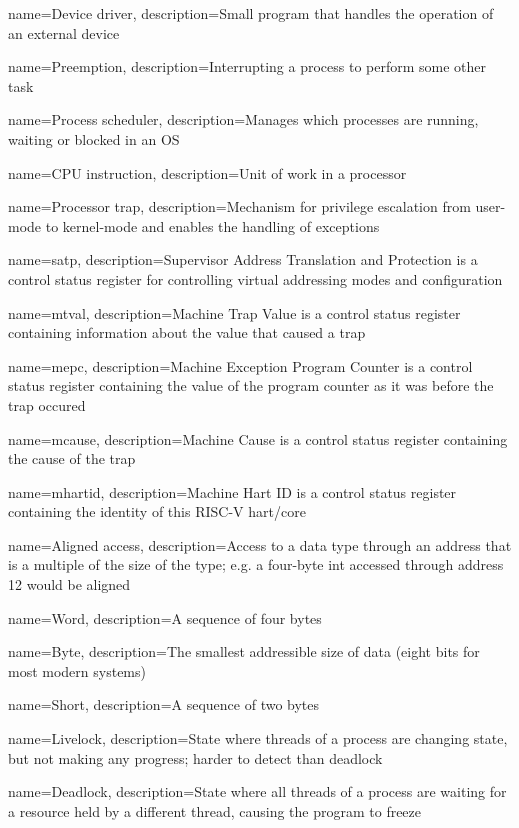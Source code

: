  {
    name=Device driver,
    description={Small program that handles the operation of an external device}
}

 {
    name=Preemption,
    description={Interrupting a process to perform some other task}
}

 {
    name=Process scheduler,
    description={Manages which processes are running, waiting or blocked in an OS}
}

 {
    name=CPU instruction,
    description={Unit of work in a processor}
}

 {
    name=Processor trap,
    description={Mechanism for privilege escalation from user-mode to kernel-mode and enables the handling of exceptions}
}

 {
    name=satp,
    description={Supervisor Address Translation and Protection is a control status register for controlling virtual addressing modes and configuration}
}

 {
    name=mtval,
    description={Machine Trap Value is a control status register containing information about the value that caused a trap}
}

 {
    name=mepc,
    description={Machine Exception Program Counter is a control status register containing the value of the program counter as it was before the trap occured}
}

 {
    name=mcause,
    description={Machine Cause is a control status register containing the cause of the trap}
}

 {
    name=mhartid,
    description={Machine Hart ID is a control status register containing the identity of this RISC-V hart/core}
}

 {
    name=Aligned access,
    description={Access to a data type through an address that is a multiple of the size of the type; e.g. a four-byte int accessed through address 12 would be aligned}
}

 {
    name=Word,
    description={A sequence of four bytes}
}

 {
    name=Byte,
    description={The smallest addressible size of data (eight bits for most modern systems)}
}

 {
    name=Short,
    description={A sequence of two bytes}
}

 {
    name=Livelock,
    description={State where threads of a process are changing state, but not making any progress; harder to detect than deadlock}
}

 {
    name=Deadlock,
    description={State where all threads of a process are waiting for a resource held by a different thread, causing the program to freeze}
}
